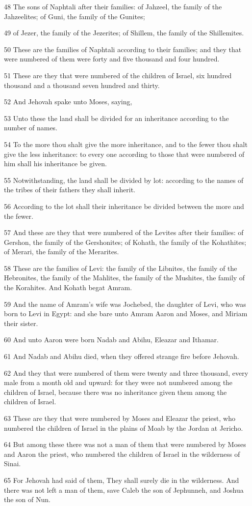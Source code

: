 \par 48 The sons of Naphtali after their families: of Jahzeel, the family of the Jahzeelites; of Guni, the family of the Gunites;
\par 49 of Jezer, the family of the Jezerites; of Shillem, the family of the Shillemites.
\par 50 These are the families of Naphtali according to their families; and they that were numbered of them were forty and five thousand and four hundred.
\par 51 These are they that were numbered of the children of Israel, six hundred thousand and a thousand seven hundred and thirty.
\par 52 And Jehovah spake unto Moses, saying,
\par 53 Unto these the land shall be divided for an inheritance according to the number of names.
\par 54 To the more thou shalt give the more inheritance, and to the fewer thou shalt give the less inheritance: to every one according to those that were numbered of him shall his inheritance be given.
\par 55 Notwithstanding, the land shall be divided by lot: according to the names of the tribes of their fathers they shall inherit.
\par 56 According to the lot shall their inheritance be divided between the more and the fewer.
\par 57 And these are they that were numbered of the Levites after their families: of Gershon, the family of the Gershonites; of Kohath, the family of the Kohathites; of Merari, the family of the Merarites.
\par 58 These are the families of Levi: the family of the Libnites, the family of the Hebronites, the family of the Mahlites, the family of the Mushites, the family of the Korahites. And Kohath begat Amram.
\par 59 And the name of Amram's wife was Jochebed, the daughter of Levi, who was born to Levi in Egypt: and she bare unto Amram Aaron and Moses, and Miriam their sister.
\par 60 And unto Aaron were born Nadab and Abihu, Eleazar and Ithamar.
\par 61 And Nadab and Abihu died, when they offered strange fire before Jehovah.
\par 62 And they that were numbered of them were twenty and three thousand, every male from a month old and upward: for they were not numbered among the children of Israel, because there was no inheritance given them among the children of Israel.
\par 63 These are they that were numbered by Moses and Eleazar the priest, who numbered the children of Israel in the plains of Moab by the Jordan at Jericho.
\par 64 But among these there was not a man of them that were numbered by Moses and Aaron the priest, who numbered the children of Israel in the wilderness of Sinai.
\par 65 For Jehovah had said of them, They shall surely die in the wilderness. And there was not left a man of them, save Caleb the son of Jephunneh, and Joshua the son of Nun.

